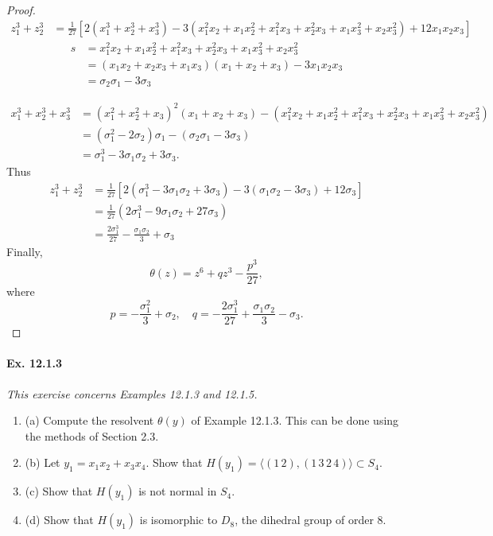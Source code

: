\documentclass[11pt,a4paper]{article}
\newcommand{\be} {\begin{enumerate}}
\newcommand{\ee} {\end{enumerate}}
\begin{document}
\begin{proof}
\begin{align*}
z_1^3 + z_2^3 &= \frac{1}{27}\left[2 (x_{1}^{3} +  x_{2}^{3} +  x_{3}^{3}) - 3 (x_{1}^{2} x_{2} + x_{1} x_{2}^{2} +x_{1}^{2} x_{3} + x_{2}^{2} x_{3} + x_{1}x_{3}^{2} +x_{2} x_{3}^{2}) + 12 x_{1} x_{2} x_{3}\right]
\end{align*}
\begin{align*}
s &= x_{1}^{2} x_{2} + x_{1} x_{2}^{2} +x_{1}^{2} x_{3} + x_{2}^{2} x_{3} + x_{1}x_{3}^{2} +x_{2} x_{3}^{2}\\
&= (x_1x_2+x_2x_3+x_1x_3)(x_1+x_2+x_3)-3x_1x_2x_3\\
&= \sigma_2 \sigma_1 - 3 \sigma_3
\end{align*}

\begin{align*}
x_1^3+x_2^3+x_3^3 &= (x_1^2+x_2^2+x_3)^2(x_1+x_2+x_3) - (x_{1}^{2} x_{2} + x_{1} x_{2}^{2} +x_{1}^{2} x_{3} + x_{2}^{2} x_{3} + x_{1}x_{3}^{2} +x_{2} x_{3}^{2})\\
&=(\sigma_1^2-2\sigma_2)\sigma_1 - (\sigma_2 \sigma_1 - 3 \sigma_3)\\
&=\sigma_1^3 -3\sigma_1\sigma_2+3\sigma_3.
\end{align*}
Thus
\begin{align*}
z_1^3 + z_2^3 &= \frac{1}{27}\left[2(\sigma_1^3 -3\sigma_1\sigma_2+3\sigma_3) -3(\sigma_1 \sigma_2 - 3 \sigma_3) + 12 \sigma_3\right]\\
&= \frac{1}{27} (2 \sigma_1^3-9\sigma_1 \sigma_2 + 27 \sigma_3)\\
&=  \frac{2\sigma_1^3}{27} - \frac{\sigma_1\sigma_2}{3} + \sigma_3
\end{align*}
Finally,
$$\theta(z) = z^6 +q z^3 -\frac{p^3}{27},$$
where
$$p = -\frac{\sigma_1^2}{3} + \sigma_2,\quad q = -\frac{2\sigma_1^3}{27} + \frac{\sigma_1\sigma_2}{3}- \sigma_3.$$
\end{proof}

\paragraph{Ex. 12.1.3}

{\it This exercise concerns Examples 12.1.3 and 12.1.5.
\be
\item[(a)] Compute the resolvent $\theta(y)$ of Example 12.1.3. This can be done using the methods of Section 2.3.
\item[(b)] Let $y_1 = x_1x_2+x_3x_4$. Show that $H(y_1) = \langle (1\, 2),(1 \, 3\, 2\,4) \rangle \subset S_4$.
\item[(c)] Show that $H(y_1)$ is not normal in $S_4$.
\item[(d)] Show that $H(y_1)$ is isomorphic to $D_8$, the dihedral group of order 8.

\ee
}
\end{document}
